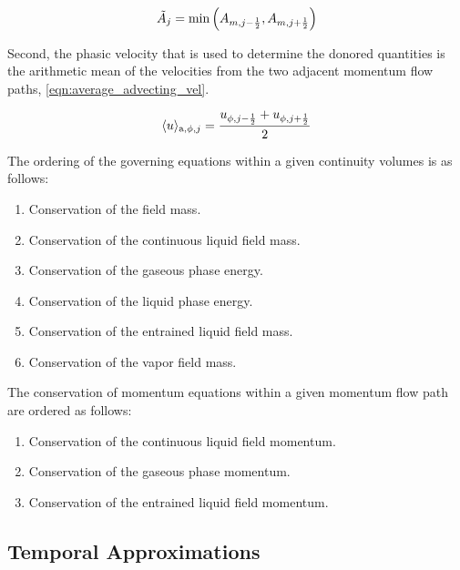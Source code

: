 \begin{equation}
\label{eqn:area_def}
\tilde{A}_{j} = \min\left(A_{m,j - \onehalf}, A_{m,j+\onehalf}\right)
\end{equation}

Second, the phasic velocity that is used to determine the donored quantities is the arithmetic mean of the velocities from the two adjacent momentum flow paths, \eqref{eqn:average_advecting_vel}.

\begin{equation}
\label{eqn:average_advecting_vel}
\ave{u}_{\text{a},\phi, j} = \frac{u_{\phi, j - \onehalf} + u_{\phi, j+ \onehalf}}{2}
\end{equation}

The ordering of the governing equations within a given continuity volumes is as follows:

\begin{enumerate}
\item{Conservation of the \ncg{} field mass.}
\item{Conservation of the continuous liquid field mass.}
\item{Conservation of the gaseous phase energy.}
\item{Conservation of the liquid phase energy.}
\item{Conservation of the entrained liquid field mass.}
\item{Conservation of the vapor field mass.}
\end{enumerate}

The conservation of momentum equations within a given momentum flow path are ordered as follows:

\begin{enumerate}
\item{Conservation of the continuous liquid field momentum.}
\item{Conservation of the gaseous phase momentum.}
\item{Conservation of the entrained liquid field momentum.}
\end{enumerate}

\subsection{Temporal Approximations}
\label{subsect:temporal_approx}

